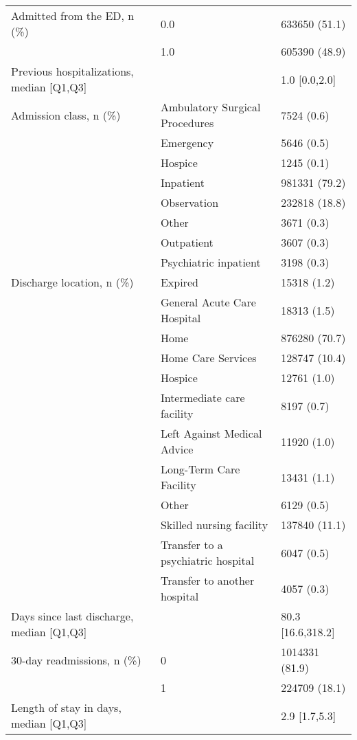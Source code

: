 \begin{tabular}{lll}
Admitted from the ED, n (\%) & 0.0 &      633650 (51.1) \\
                                       & 1.0 &      605390 (48.9) \\
Previous hospitalizations, median [Q1,Q3] &   &      1.0 [0.0,2.0] \\
Admission class, n (\%) & Ambulatory Surgical Procedures &         7524 (0.6) \\
                                       & Emergency &         5646 (0.5) \\
                                       & Hospice &         1245 (0.1) \\
                                       & Inpatient &      981331 (79.2) \\
                                       & Observation &      232818 (18.8) \\
                                       & Other &         3671 (0.3) \\
                                       & Outpatient &         3607 (0.3) \\
                                       & Psychiatric inpatient &         3198 (0.3) \\
Discharge location, n (\%) & Expired &        15318 (1.2) \\
                                       & General Acute Care Hospital &        18313 (1.5) \\
                                       & Home &      876280 (70.7) \\
                                       & Home Care Services &      128747 (10.4) \\
                                       & Hospice &        12761 (1.0) \\
                                       & Intermediate care facility &         8197 (0.7) \\
                                       & Left Against Medical Advice &        11920 (1.0) \\
                                       & Long-Term Care Facility &        13431 (1.1) \\
                                       & Other &         6129 (0.5) \\
                                       & Skilled nursing facility &      137840 (11.1) \\
                                       & Transfer to a psychiatric hospital &         6047 (0.5) \\
                                       & Transfer to another hospital &         4057 (0.3) \\
Days since last discharge, median [Q1,Q3] &   &  80.3 [16.6,318.2] \\
30-day readmissions, n (\%) & 0 &     1014331 (81.9) \\
                                       & 1 &      224709 (18.1) \\
Length of stay in days, median [Q1,Q3] &   &      2.9 [1.7,5.3] \\
\bottomrule
\end{tabular}
